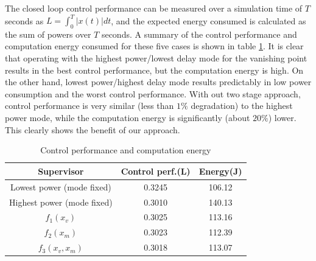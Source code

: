 The closed loop control performance can be measured over a simulation time of $T$ seconds as $L = \int_0^T |x(t)|dt$, 
and the expected energy consumed is calculated as the sum of powers over $T$ seconds.
A summary of the control performance and computation energy consumed for these five cases is shown in table \ref{tbl:performance}. It is clear that operating with the highest power/lowest delay mode for the vanishing point results in the best control performance, but the computation energy is high. On the other hand, lowest power/highest delay mode results predictably in low power consumption and the worst control performance. With out two stage approach, control performance is very similar (less than $1\%$ degradation) to the highest power mode, while the computation energy is significantly (about $20\%$) lower. This clearly shows the benefit of our approach.

\begin{table}[htb]
\begin{center}
\caption{Control performance and computation energy}
\label{tbl:performance}
\begin{tabular} {|c|c|c|}
	\hline
	\textbf{Supervisor} & \textbf{Control perf.}(L) & \textbf{Energy}(J) \\ \hline
	Lowest power (mode fixed) & 0.3245 & 106.12  \\ \hline
	Highest power (mode fixed) & 0.3010 & 140.13  \\ \hline
	 $f_1(x_v)$ & 0.3025 & 113.16  \\ \hline
	 $f_2(x_m)$ & 0.3023 & 112.39 \\ \hline
	 $f_3(x_v,x_m)$ & 0.3018 & 113.07 \\ \hline
	 
\end{tabular}
	\vspace{-10pt}	
	\end{center}
\end{table}


